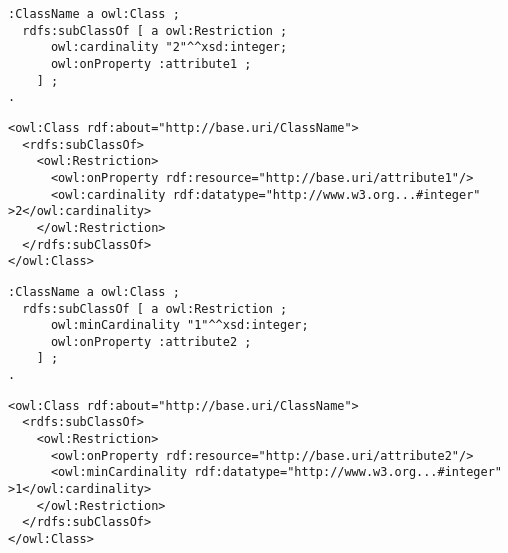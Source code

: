 \vspace{-\parskip}
\begin{minipage}[b]{.4\textwidth}
\begin{lstlisting}[language=Turtle, caption={Cardinality restriction in Turtle syntax}, captionpos=b]
:ClassName a owl:Class ;
  rdfs:subClassOf [ a owl:Restriction ;
      owl:cardinality "2"^^xsd:integer;
      owl:onProperty :attribute1 ;
    ] ;
.
\end{lstlisting}
\end{minipage}%
\quad\vspace{-\parskip}
\begin{minipage}[b]{.6\textwidth}
\begin{lstlisting}[language=RDF/XML, caption={Cardinality restriction in RDF/XML syntax}, captionpos=b]
<owl:Class rdf:about="http://base.uri/ClassName">
  <rdfs:subClassOf>
    <owl:Restriction>
      <owl:onProperty rdf:resource="http://base.uri/attribute1"/>
      <owl:cardinality rdf:datatype="http://www.w3.org...#integer" >2</owl:cardinality>
    </owl:Restriction>
  </rdfs:subClassOf>
</owl:Class>
\end{lstlisting}
\end{minipage}
\vspace{-\parskip}

\vspace{-\parskip}
\begin{minipage}[b]{.385\textwidth}
\begin{lstlisting}[language=Turtle, caption={Min cardinality restriction in Turtle syntax}, captionpos=b]
:ClassName a owl:Class ;
  rdfs:subClassOf [ a owl:Restriction ;
      owl:minCardinality "1"^^xsd:integer;
      owl:onProperty :attribute2 ;
    ] ;
.
\end{lstlisting}
\end{minipage}%
\quad\vspace{-\parskip}
\begin{minipage}[b]{.6\textwidth}
\begin{lstlisting}[language=RDF/XML, caption={Min cardinality restriction in RDF/XML syntax}, captionpos=b]
<owl:Class rdf:about="http://base.uri/ClassName">
  <rdfs:subClassOf>
    <owl:Restriction>
      <owl:onProperty rdf:resource="http://base.uri/attribute2"/>
      <owl:minCardinality rdf:datatype="http://www.w3.org...#integer" >1</owl:cardinality>
    </owl:Restriction>
  </rdfs:subClassOf>
</owl:Class>
\end{lstlisting}
\end{minipage}
\vspace{-\parskip}

